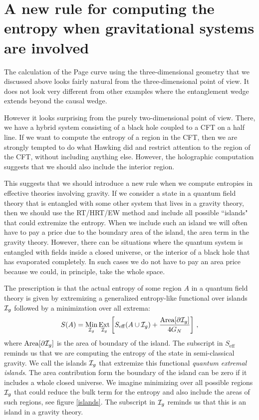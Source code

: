 \documentclass[11pt]{article}
\newcommand{\be}{\begin{equation}}
\newcommand{\ee}{\end{equation}}
\def\la{\label}
\begin{document}
\section{A new rule for computing the entropy when gravitational systems are involved} 
\label{sec:newrule}
 
The calculation of the Page curve using the three-dimensional geometry that we discussed above looks fairly natural from the three-dimensional point of view. 
It does not look very different from other examples where the entanglement wedge extends beyond the causal wedge. 

However it looks surprising from the purely two-dimensional point of view.
There, we have a hybrid system consisting of a black hole coupled to a CFT on a half line.
If we want to compute the entropy of a region in the CFT, then we are strongly tempted to do what Hawking did \cite{Hawking:1976ra}
and restrict attention to the region of the CFT, without including anything else.
However, the holographic computation suggests that we should also include the interior region. 

This suggests that we should introduce a new rule when we compute entropies in effective theories involving gravity. 
If we consider a state in a quantum field theory that is entangled with some other system that lives in a gravity theory, then we should use the RT/HRT/EW method and  include all possible ``islands" that could extremize the entropy.
When we include such an island we will often have to pay a price due to the boundary area of the island, the area term in the gravity theory.
However, there can be situations where the quantum system is entangled with fields inside a closed universe, or the interior of a black hole that has evaporated completely.
In such cases we do not have to pay an area price because we could, in principle, take the whole space. 

The prescription is that the actual entropy of some region $A$ in a quantum field theory is given by extremizing a generalized entropy-like functional over islands ${\cal I}_g$ followed by a minimization over all extrema:
\be 
    \la{NewRule}
    S(A) = \underset{{\cal I}_g}{\rm Min}  \, \underset{{\cal I}_g}{\rm Ext}  \left[ S_{\rm eff}(A \cup {{\cal I}_g}) + { \text{Area}[{\partial {\cal I}_g}] \over 4 G_N} \right] \, ,
\ee
where $\text{Area}[{\partial {\cal I}_g}]$ is the area of boundary of the island. The subscript in $S_\text{eff}$ reminds us that we are computing the entropy of the state in semi-classical gravity.
We call the islands ${\cal I}_g$ that extremize this functional \emph{quantum extremal islands}. 
The area contribution form the boundary of the island can be zero if it includes a whole closed universe. 
We imagine minimizing over all possible regions ${{\cal I}_g}$ that could reduce the bulk term for the entropy and also include the areas of such regions, see figure \ref{islands}. 
The subscript in ${{\cal I}_g}$ reminds us that this is an island in a gravity theory. 
\end{document}
